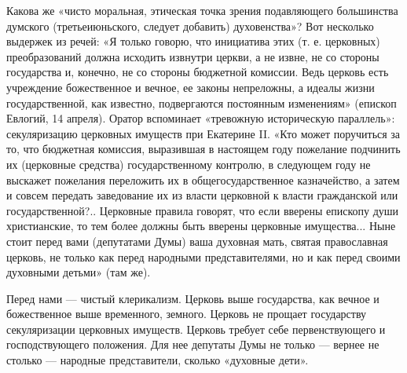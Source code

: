 \documentclass[12pt]{article}
\newcommand{\parnum}{(\arabic{parcount})}
\newcounter{parcount}
\newenvironment{parnumbers}{%
  \par%
  \everypar{\noindent \stepcounter{parcount}\marginpar[]{\parnum}}%
}{}
\begin{document}
\begin{parnumbers}
Какова же «чисто моральная, этическая точка зрения подавляющего большинства думского (третьеиюньского, следует добавить) духовенства»? Вот несколько выдержек из речей: «Я только говорю, что инициатива этих (т. е. церковных) преобразований должна исходить извнутри церкви, а не извне, не со стороны государства и, конечно, не со стороны бюджетной комиссии. Ведь церковь есть учреждение божественное и вечное, ее законы непреложны, а идеалы жизни государственной, как известно, подвергаются постоянным изменениям» (епископ Евлогий, 14 апреля). Оратор вспоминает «тревожную историческую параллель»: секуляризацию церковных имуществ при Екатерине II. «Кто может поручиться за то, что бюджетная комиссия, выразившая в настоящем году пожелание подчинить их (церковные средства) государственному контролю, в следующем году не выскажет пожелания переложить их в общегосударственное казначейство, а затем и совсем передать заведование их из власти церковной к власти гражданской или государственной?.. Церковные правила говорят, что если вверены епископу души христианские, то тем более должны быть вверены церковные имущества... Ныне стоит перед вами (депутатами Думы) ваша духовная мать, святая православная церковь, не только как перед народными представителями, но и как перед своими духовными детьми» (там же).

Перед нами — чистый клерикализм. Церковь выше государства, как вечное и божественное выше временного, земного. Церковь не прощает государству секуляризации церковных имуществ. Церковь требует себе первенствующего и господствующего положения. Для нее депутаты Думы не только — вернее не столько — народные представители, сколько «духовные дети».


\end{parnumbers}
\end{document}
